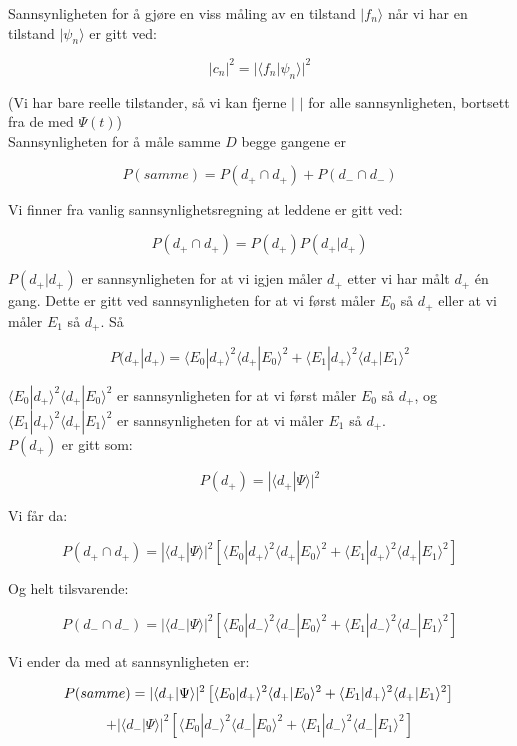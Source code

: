 \documentclass[a4paper,norsk, 10pt]{article}
\numberwithin{equation}{section}
\begin{document}
Sannsynligheten for å gjøre en viss måling av en tilstand $| f_n\rangle$ når vi har en tilstand $|\psi_n\rangle$ er gitt ved:

$$
|c_n|^2 = |\langle f_n|\psi_n\rangle|^2
$$

(Vi har bare reelle tilstander, så vi kan fjerne $|$ $|$ for alle sannsynligheten, bortsett fra de med $\Psi(t)$)\\

Sannsynligheten for å måle samme $D$ begge gangene er

\begin{equation}
P(samme) = P(d_+ \cap d_+) + P(d_- \cap d_-)
\label{eq:Psamme}
\end{equation}

Vi finner fra vanlig sannsynlighetsregning at leddene er gitt ved:

$$
P(d_+ \cap d_+) = P(d_+)P(d_+|d_+)
$$

$P(d_+|d_+)$ er sannsynligheten for at vi igjen måler $d_+$ etter vi har målt $d_+$ én gang. Dette er gitt ved sannsynligheten for at vi først måler $E_0$ så $d_+$ eller at vi måler $E_1$ så $d_+$. Så

$$
P(d_+|d_+) = \langle E_0|d_+\rangle^2\langle d_+|E_0\rangle^2 + \langle E_1|d_+\rangle^2\langle d_+|E_1\rangle^2
$$

$\langle E_0|d_+\rangle^2\langle d_+|E_0\rangle^2$ er sannsynligheten for at vi først måler $E_0$ så $d_+$, og $\langle E_1|d_+\rangle^2\langle d_+|E_1\rangle^2$ er sannsynligheten for at vi måler $E_1$ så $d_+$. \\

$P(d_+)$ er gitt som:

$$
P(d_+) = |\langle d_+|\Psi\rangle|^2
$$

Vi får da:

$$
P(d_+ \cap d_+) = |\langle d_+|\Psi\rangle|^2\left[\langle E_0|d_+\rangle^2\langle d_+|E_0\rangle^2 + \langle E_1|d_+\rangle^2\langle d_+|E_1\rangle^2\right]
$$


Og helt tilsvarende:

$$
P(d_- \cap d_-) = |\langle d_-|\Psi\rangle|^2\left[\langle E_0|d_-\rangle^2\langle d_-|E_0\rangle^2 + \langle E_1|d_-\rangle^2\langle d_-|E_1\rangle^2\right]
$$

Vi ender da med at sannsynligheten er:

$$
P(samme) = |\langle d_+|\Psi\rangle|^2\left[\langle E_0|d_+\rangle^2\langle d_+|E_0\rangle^2 + \langle E_1|d_+\rangle^2\langle d_+|E_1\rangle^2\right] \\
$$
$$
+
 |\langle d_-|\Psi\rangle|^2\left[\langle E_0|d_-\rangle^2\langle d_-|E_0\rangle^2 + \langle E_1|d_-\rangle^2\langle d_-|E_1\rangle^2\right]
$$
\end{document}
